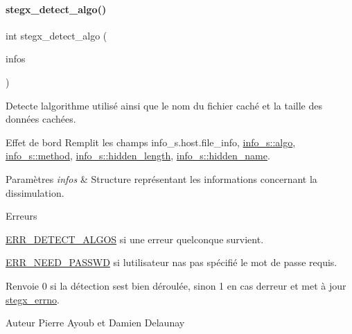 \paragraph{\texorpdfstring{stegx\+\_\+detect\+\_\+algo()}{stegx\_detect\_algo()}}
{\footnotesize\ttfamily int stegx\+\_\+detect\+\_\+algo (\begin{DoxyParamCaption}\item[{\hyperlink{a00008_aa8ca908d92fb5bdd3c0a9e1f58b2cf03}{info\+\_\+s} $\ast$}]{infos }\end{DoxyParamCaption})}



Detecte l\textquotesingle{}algorithme utilisé ainsi que le nom du fichier caché et la taille des données cachées. 

\begin{DoxyParagraph}{Effet de bord}
Remplit les champs info\+\_\+s.\+host.\+file\+\_\+info, \hyperlink{a00154_aa6ad0a3fe5b1489edc6684da68c3b588}{info\+\_\+s\+::algo}, \hyperlink{a00154_afe7c54ffc777d8584a1fc4f9e78790d0}{info\+\_\+s\+::method}, \hyperlink{a00154_a5faadf710cbff5ed6e2882e78216084c}{info\+\_\+s\+::hidden\+\_\+length}, \hyperlink{a00154_afa18e57ba4ce959f5ecd8502fd19f858}{info\+\_\+s\+::hidden\+\_\+name}. 
\end{DoxyParagraph}

\begin{DoxyParams}{Paramètres}
{\em infos} & Structure représentant les informations concernant la dissimulation. \\
\hline
\end{DoxyParams}
\begin{DoxyRefDesc}{Erreurs}
\item[\hyperlink{a00134__errors000005}{Erreurs}]\hyperlink{a00011_a08b18ac8af0f3462354240d9732f3852a65deae87741eaa0b2b39fe1116bfd563}{E\+R\+R\+\_\+\+D\+E\+T\+E\+C\+T\+\_\+\+A\+L\+G\+OS} si une erreur quelconque survient. 

\hyperlink{a00011_a08b18ac8af0f3462354240d9732f3852a0639f3719d0bf22c36b5ca1711fe3d7e}{E\+R\+R\+\_\+\+N\+E\+E\+D\+\_\+\+P\+A\+S\+S\+WD} si l\textquotesingle{}utilisateur n\textquotesingle{}as pas spécifié le mot de passe requis. \end{DoxyRefDesc}
\begin{DoxyReturn}{Renvoie}
0 si la détection s\textquotesingle{}est bien déroulée, sinon 1 en cas d\textquotesingle{}erreur et met à jour \hyperlink{a00062_a5ec48ccdfbe19fe23855818f8556abec}{stegx\+\_\+errno}. 
\end{DoxyReturn}
\begin{DoxyAuthor}{Auteur}
Pierre Ayoub et Damien Delaunay 
\end{DoxyAuthor}


